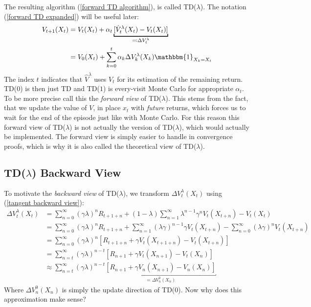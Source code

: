 The resulting algorithm (\ref{forward TD algorithm}), is called TD(\(\lambda\)). The notation (\ref{forward TD expanded}) will be useful later:
\begin{align}
	V_{t+1}(X_t)&= V_t(X_t) + \alpha_t \underbracket[1pt]{[\hat{V}_t^\lambda(X_t)-V_t(X_t)]}_{
		\eqqcolon \Delta V^\lambda_t
	}\label{forward TD algorithm} \\
	&=V_0(X_t) + \sum_{k=0}^t \alpha_k\Delta V^\lambda_k(X_k) \mathbbm{1}_{X_k=X_t}\label{forward TD expanded}
\end{align}
The index \(t\) indicates that \(\hat{V}^\lambda\) uses \(V_t\) for its estimation of the remaining return. TD(\(0\)) is then just TD and TD(\(1\)) is every-visit Monte Carlo for appropriate \(\alpha_t\).
To be more precise \textcite{suttonReinforcementLearningIntroduction1998} call this the \emph{forward view} of TD(\(\lambda\)). This stems from the fact, that we update the value of \(V\), in place \(x_t\) with \emph{future} returns, which forces us to wait for the end of the episode just like with Monte Carlo. For this reason this forward view of TD(\(\lambda\)) is not actually the version of TD(\(\lambda\)), which would actually be implemented. The forward view is simply easier to handle in convergence proofs, which is why it is also called the theoretical view of TD(\(\lambda\)). 

\subsection{TD(\(\lambda\)) Backward View}
To motivate the \emph{backward view} of TD(\(\lambda\)), we transform \(\Delta V_t^\lambda (X_t)\) using (\ref{tangent backward view}):
\begin{align*}
	\Delta V_t^\lambda (X_t)&= \sum_{n=0}^\infty (\gamma\lambda)^n R_{t+1+n}
	+ (1-\lambda)\sum_{n=1}^\infty \lambda^{n-1}\gamma^n V_t(X_{t+n}) - V_t(X_t)\\
	&=\sum_{n=0}^\infty (\gamma\lambda)^n R_{t+1+n} 
	+ \sum_{n=1}^\infty (\lambda\gamma)^{n-1} \gamma V_t(X_{t+n}) 
	- \sum_{n=0}^\infty (\lambda\gamma)^n V_t(X_{t+n})\\
	&=\sum_{n=0}^\infty(\gamma\lambda)^n \left[
		R_{t+1+n} + \gamma V_t(X_{t+1+n}) - V_t(X_{t+n})
	\right]\\
	&=\sum_{n=t}^\infty(\gamma\lambda)^{n-t} \left[
		R_{n+1} + \gamma V_t(X_{n+1}) - V_t(X_{n})
	\right]\\
	&\approx \sum_{n=t}^\infty(\gamma\lambda)^{n-t} 
	\underbracket{\left[
		R_{n+1} + \gamma V_n(X_{n+1}) - V_n(X_{n})
	\right]}_{
		=\Delta V^0_n(X_n)
	}
\end{align*}
Where \(\Delta V^0_n(X_n)\) is simply the update direction of TD(0). Now why does this approximation make sense? 

